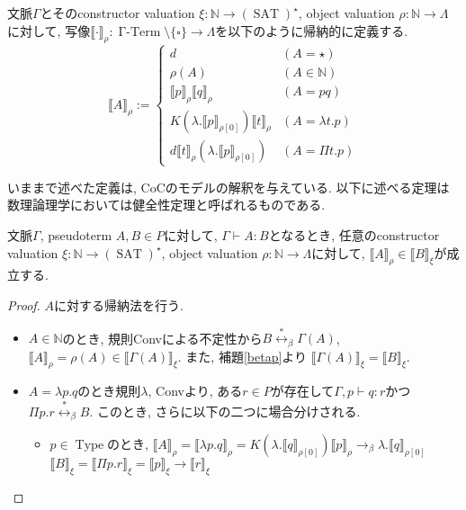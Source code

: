 \documentclass[12pt, titlepage]{ltjsarticle}
\DeclareMathOperator{\Type}{Type}
\DeclareMathOperator{\SAT}{SAT}
\DeclareMathOperator{\GTerm}{\Gamma-Term}
\newcommand{\iprt}[2]{\llbracket {#1} \rrbracket_ {#2}}
\begin{document}
\begin{defn}
 文脈$\Gamma$とそのconstructor valuation $\xi : \mathbb{N} \rightarrow (\SAT)^\star$, object valuation $\rho : \mathbb{N} \rightarrow \Lambda$に対して, 写像$\iprt{\cdot}{\rho} : \GTerm \setminus \{\square\} \rightarrow \Lambda$を以下のように帰納的に定義する.
\[
 \iprt{A}{\rho} := \begin{cases}
    d & (A = \star) \\
    \rho (A) & (A \in \mathbb{N}) \\
    \iprt{p}{\rho} \iprt{q}{\rho} & (A = p q) \\
    K (\lambda . \iprt{p}{\rho[0]}) \iprt{t}{\rho} & (A = \lambda t. p) \\
    d \iprt{t}{\rho} (\lambda . \iprt{p}{\rho[0]}) & (A = \Pi t. p)
  \end{cases}
\]
\end{defn}

いままで述べた定義は, CoCのモデルの解釈を与えている. 以下に述べる定理は数理論理学においては健全性定理と呼ばれるものである.

\begin{thm}
 文脈$\Gamma$, pseudoterm $A, B \in P$に対して, $\Gamma \vdash A \colon B$となるとき,
 任意のconstructor valuation $\xi : \mathbb{N} \rightarrow (\SAT)^\star$, object valuation $\rho : \mathbb{N} \rightarrow \Lambda$に対して, $\iprt{A}{\rho} \in \iprt{B}{\xi}$が成立する.
\end{thm}
\begin{proof}
 $A$に対する帰納法を行う.
 \begin{itemize}
  \item $A \in \mathbb{N}$のとき, 規則Convによる不定性から$B \overset{*}{\leftrightarrow}_\beta \Gamma(A)$, $\iprt{A}{\rho} = \rho (A) \in \iprt{\Gamma(A)}{\xi}$.
        また, 補題\ref{betap}より $\iprt{\Gamma(A)}{\xi} = \iprt{B}{\xi}$.
  \item $A = \lambda p. q$のとき規則$\lambda$, Convより, ある$r \in P$が存在して$\Gamma, p \vdash q \colon r$かつ$\Pi p. r \overset{*}{\leftrightarrow}_\beta B$. このとき, さらに以下の二つに場合分けされる.
 \begin{itemize}
  \item $p \in \Type$のとき,
        $\iprt{A}{\rho} = \iprt{\lambda p. q}{\rho} = K (\lambda . \iprt{q}{\rho[0]}) \iprt{p}{\rho} \rightarrow_\beta \lambda . \iprt{q}{\rho[0]}$
        $\iprt{B}{\xi} = \iprt{\Pi p. r}{\xi} = \iprt{p}{\xi} \rightarrow \iprt{r}{\xi}$
 \end{itemize}
 \end{itemize}
\end{proof}
\end{document}
